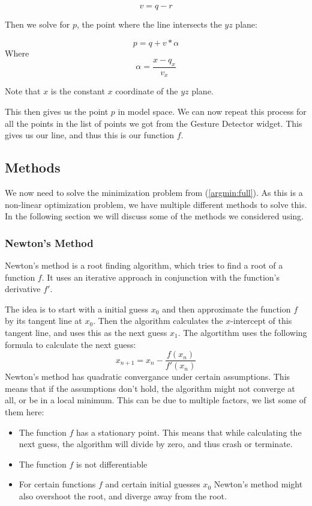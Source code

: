 \[v = q - r\]

Then we solve for $p$, the point where the line intersects the $yz$ plane:

\[p = q + v * \alpha\] Where \[\alpha = \frac{x - q_x}{v_x}\]

Note that $x$ is the constant $x$ coordinate of the $yz$ plane.

This then gives us the point $p$ in model space. We can now repeat this process for all the points in the list of points we got from the Gesture Detector widget. This gives us our line, and thus this is our function $f$.

\subsection{Methods}

We now need to solve the minimization problem from (\ref{argmin:full}). As this is a non-linear optimization problem, we have multiple different methods to solve this. In the following section we will discuss
some of the methods we considered using. 

\subsubsection{Newton's Method}

Newton's method is a root finding algorithm, which tries to find a root of a function $f$. It uses an iterative approach in conjunction with the function's derivative $f'$. 

The idea is to start with a initial guess $x_0$ and then approximate the function $f$ by its tangent line at $x_0$. Then the algorithm calculates the $x$-intercept of this tangent line, and uses this as the next guess $x_1$. 
The algortithm uses the following formula to calculate the next guess:
\[
    x_{n+1} = x_n - \frac{f(x_n)}{f'(x_n)}  
\]
Newton's method has quadratic convergance under certain assumptions. This means that if the assumptions don't hold, the algorithm might not converge at all, or be in a local minimum. This can be due to multiple factors, we 
list some of them here:

\begin{itemize}
    \item The function $f$ has a stationary point. This means that while calculating the next guess, the algorithm will divide by zero, and thus crash or terminate.
    \item The function $f$ is not differentiable
    \item For certain functions $f$ and certain initial guesses $x_0$ Newton's method might also overshoot the root, and diverge away from the root.
\end{itemize}

